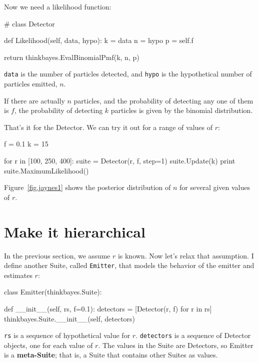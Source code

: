 \documentclass[12pt]{book}
\theoremstyle{exercise}
\begin{document}
Now we need a likelihood function:

\begin{code}
# class Detector

    def Likelihood(self, data, hypo):
        k = data
        n = hypo
        p = self.f

        return thinkbayes.EvalBinomialPmf(k, n, p)
\end{code}

{\tt data} is the number of particles detected, and {\tt hypo} is
the hypothetical number of particles emitted, $n$.

If there are actually $n$ particles, and the probability of detecting
any one of them is $f$, the probability of detecting $k$ particles is
given by the binomial distribution.

That's it for the Detector.  We can try it out for a range
of values of $r$:

\begin{code}
    f = 0.1
    k = 15

    for r in [100, 250, 400]:
        suite = Detector(r, f, step=1)
        suite.Update(k)
        print suite.MaximumLikelihood()
\end{code}

Figure~\ref{fig.jaynes1} shows the posterior distribution of $n$ for
several given values of $r$.


\section{Make it hierarchical}

In the previous section, we assume $r$ is known.  Now let's
relax that assumption.  I define another Suite, called {\tt Emitter},
that models the behavior of the emitter and estimates $r$:

\begin{code}
class Emitter(thinkbayes.Suite):

    def __init__(self, rs, f=0.1):
        detectors = [Detector(r, f) for r in rs]
        thinkbayes.Suite.__init__(self, detectors)
\end{code}

{\tt rs} is a sequence of hypothetical value for $r$.  {\tt detectors}
is a sequence of Detector objects, one for each value of $r$.  The
values in the Suite are Detectors, so Emitter is a {\bf meta-Suite};
that is, a Suite that contains other Suites as values.
\end{document}
